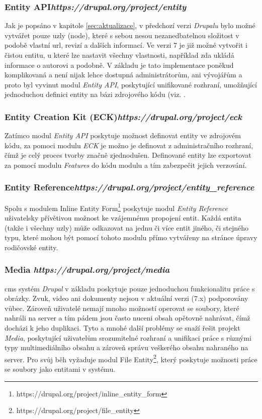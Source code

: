 \subsubsection*{\textbf{Entity API}\hfill \emph{https://drupal.org/project/entity}}
Jak je popsáno v kapitole \ref{sec:aktualizace}, v předchozí verzi \emph{Drupalu} bylo možné vytvářet pouze uzly (node), které s sebou nesou nezanedbatelnou složitost v podobě vlastní \gls{url}, revizí a dalších informací. Ve verzi 7 je již možné vytvořit i čistou entitu, u které lze nastavit všechny vlastnosti, například zda ukládá informace o autorovi a podobně. V základu je tato implementace poněkud komplikovaná a není nijak lehce dostupná administrátorům, ani vývojářům a proto byl vyvinut modul \emph{Entity API}, poskytující unifikované rozhraní, umožňující jednoduchou definici entity na bázi zdrojového kódu (viz. \cite{drupal-entities}. 

\subsubsection*{\textbf{Entity Creation Kit} (ECK)\hfill \emph{https://drupal.org/project/eck}} 
Zatímco modul \emph{Entity API} poskytuje možnost definovat entity ve zdrojovém kódu, za pomoci modulu \emph{ECK} je možno je definovat z administračního rozhraní, čímž je celý proces tvorby značně zjednodušen. Definované entity lze exportovat za pomocí modulu \emph{Features} do kódu modulu a tím zabezpečit jejich verzování.

\subsubsection*{\textbf{Entity Reference}\hfill \emph{https://drupal.org/project/entity\_reference}}
Spolu s modulem Inline Entity Form\footnote{https://drupal.org/project/inline\_entity\_form} poskytuje modul \emph{Entity Reference} uživatelsky přívětivou možnost ke vzájemnému propojení entit. Každá entita (takže i všechny uzly) může odkazovat na jednu či více entit jiného, či stejného typu, které mohou být pomocí tohoto modulu přímo vytvářeny na stránce úpravy rodičovské entity. 

\subsubsection*{\textbf{Media} \hfill \emph{https://drupal.org/project/media}}
\label{subsec:media}
\gls{cms} systém \emph{Drupal} v základu poskytuje pouze jednoduchou funkcionalitu práce s obrázky. Zvuk, video ani dokumenty nejsou v aktuální verzi (7.x) podporovány vůbec. Zároveň uživatelé nemají mnoho možností operovat se soubory, které nahráli na server a tím pádem jsou často nuceni obsah opětovně nahrávat, čímž docházi k jeho duplikaci. Tyto a mnohé další problémy se snaží řešit projekt \emph{Media}, poskytující uživatelům srozumitelné rozhraní a unifikaci práce s různými typy multimediálního obsahu a zároveň správu veškerého obsahu nahraného na server. Pro svůj běh vyžaduje modul File Entity\footnote{https://drupal.org/project/file\_entity}, který poskytuje možnosti práce se soubory jako entitami v systému.


